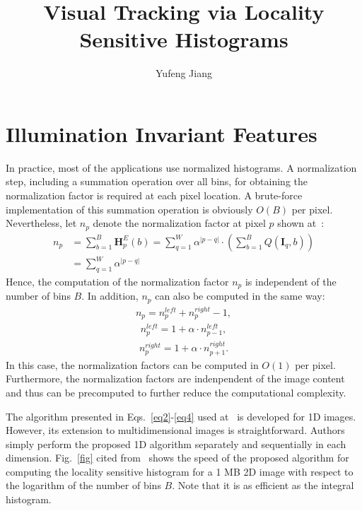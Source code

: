 \documentclass[10pt,twocolumn,letterpaper]{article}
\begin{document}
\title{Visual Tracking via Locality Sensitive Histograms}
\author{Yufeng Jiang}
\maketitle

\section{Illumination Invariant Features}

In practice, most of the applications use normalized histograms. A normalization step, including a summation operation over all bins, for obtaining the normalization factor is required at each pixel location. A brute-force implementation of this summation operation is obviously $O(B)$ per pixel. Nevertheless, let $n_p$ denote the normalization factor at pixel $p$ shown at~\cite{via}:\\
\begin{align*}
n_p &= \sum_{b=1}^B\mathbf{H}_p^E(b) = \sum_{q=1}^W\alpha^{|p-q|} \cdot (\sum_{b=1}^BQ(\mathbf{I}_q,b)) \\
&= \sum_{q=1}^W\alpha^{|p-q|}
\tag{1}
\label{eq1}
\end{align*}
Hence, the computation of the normalization factor $n_p$ is independent of the number of bins $B$. In addition, $n_p$ can also be computed in the same way:\\
\begin{gather*}
n_p = n_p^{left} + n_p^{right} - 1,
\tag{2}
\label{eq2}
\end{gather*}
\begin{gather*}
n_p^{left} = 1 + \alpha \cdot n_{p-1}^{left},
\tag{3}
\label{eq3}
\end{gather*}
\begin{gather*}
n_p^{right} = 1 + \alpha \cdot n_{p+1}^{right}.
\tag{4}
\label{eq4}
\end{gather*}
In this case, the normalization factors can be computed in $O(1)$ per pixel. Furthermore, the normalization factors are indenpendent of the image content and thus can be precomputed to further reduce the computational complexity.

The algorithm presented in Eqs.~\ref{eq2}-\ref{eq4} used at~\cite{via} is developed for 1D images. However, its extension to multidimensional images is straightforward. Authors simply perform the proposed 1D algorithm separately and sequentially in each dimension. Fig.~\ref{fig} cited from~\cite{via} shows the speed of the proposed algorithm for computing the locality sensitive histogram for a 1 MB 2D image with respect to the logarithm of the number of bins $B$. Note that it is as efficient as the integral histogram. 
\end{document}
